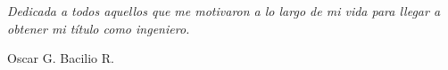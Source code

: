 \documentclass[11pt, oneside]{Thesis} %
\begin{document}
\null\vfill %

\textit{Dedicada a todos aquellos que me motivaron a lo largo de mi vida para llegar a obtener mi título como ingeniero.}

\begin{flushright}
Oscar G. Bacilio R.
\end{flushright}

\vfill\vfill\vfill\vfill\null %

\clearpage %

\end{document}
